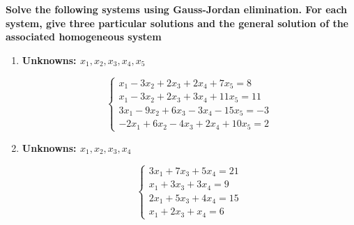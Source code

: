 \item \textbf{Solve the following systems using
Gauss-Jordan elimination. For each system,
give three particular solutions and the
general solution of the associated
homogeneous system}

\begin{enumerate}[label=\alph*)]

    \item \textbf{Unknowns:
    $x_1,x_2,x_3,x_4,x_5$}

    $$
    \begin{cases}
        x_1-3x_2+2x_3+2x_4+7x_5=8\\
        x_1-3x_2+2x_3+3x_4+11x_5=11\\
        3x_1-9x_2+6x_3-3x_4-15x_5=-3\\
        -2x_1+6x_2-4x_3+2x_4+10x_5=2
    \end{cases}
    $$

    

    \item \textbf{Unknowns:
    $x_1,x_2,x_3,x_4$}

    $$
    \begin{cases}
        3x_1+7x_3+5x_4=21\\
        x_1+3x_3+3x_4=9\\
        2x_1+5x_3+4x_4=15\\
        x_1+2x_3+x_4=6
    \end{cases}
    $$

    

\end{enumerate}
